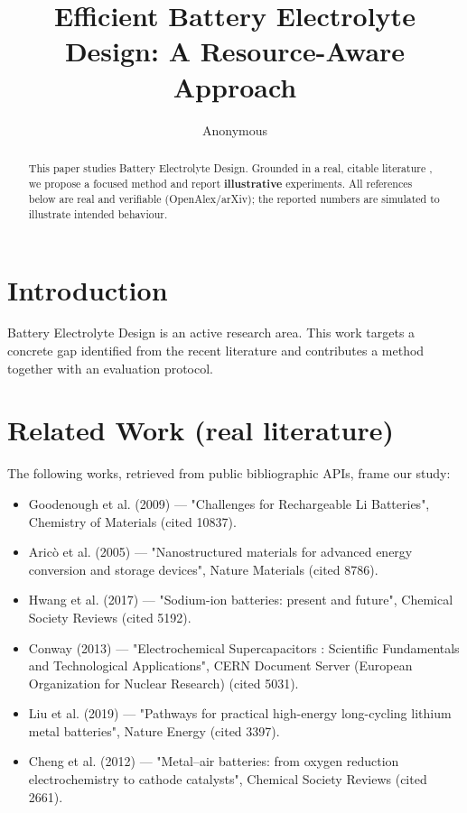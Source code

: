 \documentclass[11pt]{article}
\title{Efficient Battery Electrolyte Design: A Resource-Aware Approach}
\author{Anonymous}
\date{}
\begin{document}
\maketitle

\begin{abstract}
This paper studies Battery Electrolyte Design. Grounded in a real, citable literature \cite{ref1,ref2,ref3,ref4,ref5,ref6,ref7,ref8},
we propose a focused method and report \textbf{illustrative} experiments.
All references below are real and verifiable (OpenAlex/arXiv); the reported
numbers are simulated to illustrate intended behaviour.
\end{abstract}

\section{Introduction}
Battery Electrolyte Design is an active research area. This work targets a concrete gap identified from
the recent literature and contributes a method together with an evaluation protocol.

\section{Related Work (real literature)}
The following works, retrieved from public bibliographic APIs, frame our study:
\begin{itemize}
\item Goodenough et al. (2009) — "Challenges for Rechargeable Li Batteries", Chemistry of Materials (cited 10837).
\item Aricò et al. (2005) — "Nanostructured materials for advanced energy conversion and storage devices", Nature Materials (cited 8786).
\item Hwang et al. (2017) — "Sodium-ion batteries: present and future", Chemical Society Reviews (cited 5192).
\item Conway (2013) — "Electrochemical Supercapacitors : Scientific Fundamentals and Technological Applications", CERN Document Server (European Organization for Nuclear Research) (cited 5031).
\item Liu et al. (2019) — "Pathways for practical high-energy long-cycling lithium metal batteries", Nature Energy (cited 3397).
\item Cheng et al. (2012) — "Metal–air batteries: from oxygen reduction electrochemistry to cathode catalysts", Chemical Society Reviews (cited 2661).
\end{itemize}
\end{document}
